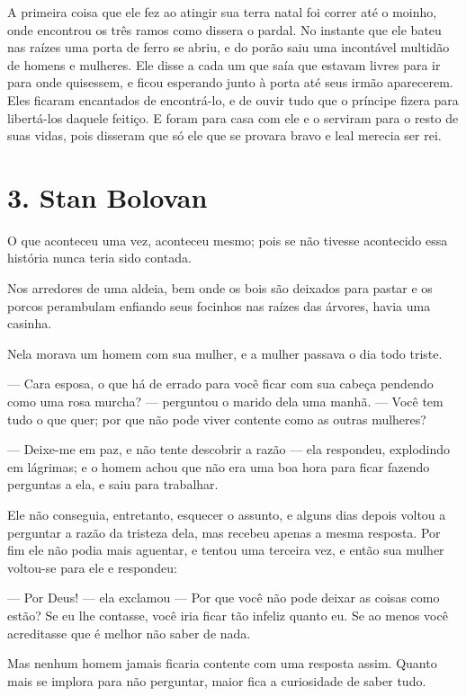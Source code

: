 A primeira coisa que ele fez ao atingir sua terra natal foi correr até
o moinho, onde encontrou os três ramos como dissera o pardal. No
instante que ele bateu nas raízes uma porta de ferro se abriu, e do
porão saiu uma incontável multidão de homens e mulheres. Ele disse a
cada um que saía que estavam livres para ir para onde quisessem, e
ficou esperando junto à porta até seus irmão aparecerem. Eles ficaram
encantados de encontrá-lo, e de ouvir tudo que o príncipe fizera para
libertá-los daquele feitiço. E foram para casa com ele e o serviram
para o resto de suas vidas, pois disseram que só ele que se provara
bravo e leal merecia ser rei.

\chapter{3. Stan Bolovan}

O que aconteceu uma vez, aconteceu mesmo; pois se não tivesse
acontecido essa história nunca teria sido contada.

Nos arredores de uma aldeia, bem onde os bois são deixados para pastar
e os porcos perambulam enfiando seus focinhos nas raízes das árvores,
havia uma casinha. 

Nela morava um homem com sua mulher, e a mulher passava o dia todo
triste.

— Cara esposa, o que há de errado para você ficar com sua cabeça
pendendo como uma rosa murcha? — perguntou o marido dela uma manhã. —
Você tem tudo o que quer; por que não pode viver contente como as
outras mulheres?

— Deixe-me em paz, e não tente descobrir a razão — ela respondeu,
explodindo em lágrimas; e o homem achou que não era uma boa hora para
ficar fazendo perguntas a ela, e saiu para trabalhar.

Ele não conseguia, entretanto, esquecer o assunto, e alguns dias
depois voltou a perguntar a razão da tristeza dela, mas recebeu
apenas a mesma resposta. Por fim ele não podia mais aguentar, e
tentou uma terceira vez, e então sua mulher voltou-se para ele e
respondeu:

— Por Deus! — ela exclamou — Por que você não pode deixar as coisas
como estão? Se eu lhe contasse, você iria ficar tão infeliz quanto
eu. Se ao menos você acreditasse que é melhor não saber de nada.

Mas nenhum homem jamais ficaria contente com uma resposta assim.
Quanto mais se implora para não perguntar, maior fica a curiosidade
de saber tudo.

